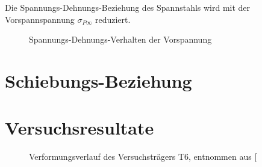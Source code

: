 \documentclass[
  11pt,
  letterpaper,
]{scrreprt}
\begin{document}
Die Spannungs-Dehnungs-Beziehung des Spannstahls wird mit der
Vorspannspannung \(\sigma_{P\infty}\) reduziert.

\begin{figure}[H]


\caption{\label{fig-sigma_eps_vorspannung_t6}Spannungs-Dehnungs-Verhalten
der Vorspannung}

\end{figure}%

\section{Schiebungs-Beziehung}\label{schiebungs-beziehung}

\section{Versuchsresultate}\label{versuchsresultate}

\begin{figure}[H]


\caption{\label{fig-durchbiegung_laengs_t6}Verformungsverlauf des
Versuchsträgers T6, entnommen aus
{[}\citeproc{ref-sigrist_versuche_1993}{5}{]}}

\end{figure}%
\end{document}
